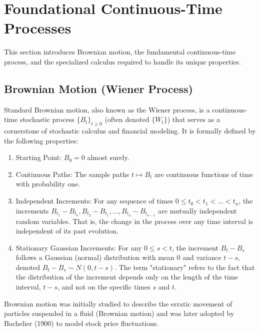 \documentclass[11pt,twoside,openright]{report}
\begin{document}
\section{Foundational Continuous-Time Processes}
\label{sec:brownian_ito}

This section introduces Brownian motion, the fundamental continuous-time process, and the specialized calculus required to handle its unique properties.

\subsection{Brownian Motion (Wiener Process)}
\label{subsec:brownian_motion}

Standard Brownian motion, also known as the Wiener process, is a continuous-time stochastic process $\{B_t\}_{t \ge 0}$ (often denoted $\{W_t\}$) that serves as a cornerstone of stochastic calculus and financial modeling. It is formally defined by the following properties:
\begin{enumerate}
    \item Starting Point: $B_0 = 0$ almost surely.
    \item Continuous Paths: The sample paths $t \mapsto B_t$ are continuous functions of time with probability one.
    \item Independent Increments: For any sequence of times $0 \le t_0 < t_1 < \dots < t_n$, the increments $B_{t_1} - B_{t_0}, B_{t_2} - B_{t_1}, \dots, B_{t_n} - B_{t_{n-1}}$ are mutually independent random variables. That is, the change in the process over any time interval is independent of its past evolution.
    \item Stationary Gaussian Increments: For any $0 \le s < t$, the increment $B_t - B_s$ follows a Gaussian (normal) distribution with mean 0 and variance $t-s$, denoted $B_t - B_s \sim N(0, t-s)$. The term "stationary" refers to the fact that the distribution of the increment depends only on the length of the time interval, $t-s$, and not on the specific times $s$ and $t$.
\end{enumerate}
Brownian motion was initially studied to describe the erratic movement of particles suspended in a fluid (Brownian motion) and was later adopted by Bachelier (1900) to model stock price fluctuations.
\end{document}
